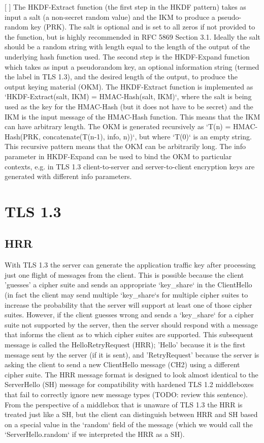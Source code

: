 [ ] The HKDF-Extract function (the first step in the HKDF pattern) takes as input a salt (a non-secret random value) and the IKM to produce a pseudo-random key (PRK). The salt is optional and is set to all zeros if not provided to the function, but is highly recommended in RFC 5869 Section 3.1. Ideally the salt should be a random string with length equal to the length of the output of the underlying hash function used. The second step is the HKDF-Expand  function which takes as input a pseudorandom key, an optional information string (termed the label in TLS 1.3), and the desired length of the output, to produce the output keying material (OKM). The HKDF-Extract function is implemented as `HKDF-Extract(salt, IKM) = HMAC-Hash(salt, IKM)`, where the salt is being used as the key for the HMAC-Hash (but it does not have to be secret) and the IKM is the input message of the HMAC-Hash function. This means that the IKM can have arbitrary length. The OKM is generated recursively as `T(n) = HMAC-Hash(PRK, concatenate(T(n-1), info, n))`, but where `T(0)` is an empty string. This recursive pattern means that the OKM can be arbitrarily long. The info parameter in HKDF-Expand can be used to bind the OKM to particular contexts, e.g. in TLS 1.3 client-to-server and server-to-client encryption keys are generated with different info parameters. 

\section{TLS 1.3}
\subsection{HRR}
With TLS 1.3 the server can generate the application traffic key after processing just one flight of messages from the client. This is possible because the client 'guesses' a cipher suite and sends an appropriate `key_share` in the ClientHello (in fact the client may send multiple `key_share`s for multiple cipher suites to increase the probability that the server will support at least one of those cipher suites. However, if the client guesses wrong and sends a `key_share` for a cipher suite not supported by the server, then the server should respond with a message that informs the client as to which cipher suites are supported. This subsequent message is called the HelloRetryRequest (HRR); 'Hello' because it is the first message sent by the server (if it is sent), and 'RetryRequest' because the server is asking the client to send a new ClientHello message (CH2) using a different cipher suite. The HRR message format is designed to look almost identical to the ServerHello (SH) message for compatibility with hardened TLS 1.2 middleboxes that fail to correctly ignore new message types (TODO: review this sentence). From the perspective of a middlebox that is unaware of TLS 1.3 the HRR is treated just like a SH, but the client can distinguish between HRR and SH based on a special value in the `random` field of the message (which we would call the `ServerHello.random` if we interpreted the HRR as a SH).

